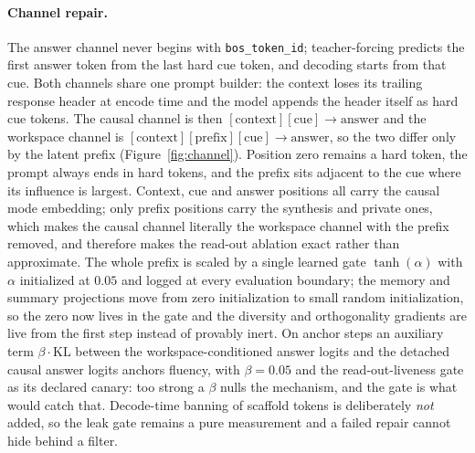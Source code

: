 \documentclass[10pt,a4paper]{article}
\begin{document}
\paragraph{Channel repair.}
The answer channel never begins with \texttt{bos\_token\_id}; teacher-forcing
predicts the first answer token from the last hard cue token, and decoding
starts from that cue. Both channels share one prompt builder: the context
loses its trailing response header at encode time and the model appends the
header itself as hard cue tokens. The causal channel is then
$[\text{context}][\text{cue}] \rightarrow \text{answer}$ and the workspace
channel is $[\text{context}][\text{prefix}][\text{cue}] \rightarrow
\text{answer}$, so the two differ only by the latent prefix
(Figure~\ref{fig:channel}). Position zero remains a hard token, the prompt
always ends in hard tokens, and the prefix sits adjacent to the cue where its
influence is largest. Context, cue and answer positions all carry the causal
mode embedding; only prefix positions carry the synthesis and private ones,
which makes the causal channel literally the workspace channel with the
prefix removed, and therefore makes the read-out ablation exact rather than
approximate. The whole prefix is scaled by a single learned gate
$\tanh(\alpha)$ with $\alpha$ initialized at $0.05$ and logged at every
evaluation boundary; the memory and summary projections move from zero
initialization to small random initialization, so the zero now lives in the
gate and the diversity and orthogonality gradients are live from the first
step instead of provably inert. On anchor steps an auxiliary term
$\beta \cdot \mathrm{KL}$ between the workspace-conditioned answer logits and
the detached causal answer logits anchors fluency, with $\beta = 0.05$ and
the read-out-liveness gate as its declared canary: too strong a $\beta$ nulls
the mechanism, and the gate is what would catch that. Decode-time banning of
scaffold tokens is deliberately \emph{not} added, so the leak gate remains a
pure measurement and a failed repair cannot hide behind a filter.
\end{document}
